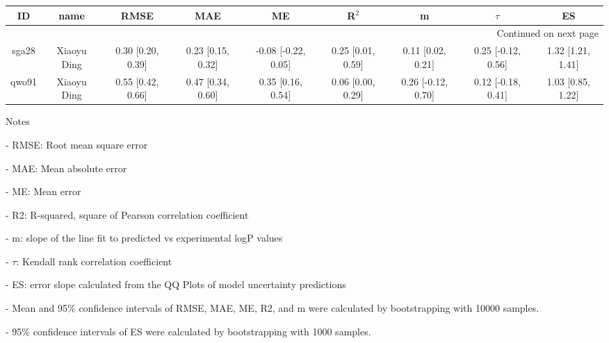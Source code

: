 \documentclass{article}
\begin{document}
\begin{center}
\scriptsize
\begin{longtable}{|ccccccccc|}
\toprule
    ID &         name &               RMSE &                MAE &                   ME &              R$^2$ &                   m &              $\tau$ &                 ES \\
\midrule
\endhead
\midrule
\multicolumn{9}{r}{{Continued on next page}} \\
\midrule
\endfoot

\bottomrule
\endlastfoot
 sga28 &  Xiaoyu Ding &  0.30 [0.20, 0.39] &  0.23 [0.15, 0.32] &  -0.08 [-0.22, 0.05] &  0.25 [0.01, 0.59] &   0.11 [0.02, 0.21] &  0.25 [-0.12, 0.56] &  1.32 [1.21, 1.41] \\
 qwo91 &  Xiaoyu Ding &  0.55 [0.42, 0.66] &  0.47 [0.34, 0.60] &    0.35 [0.16, 0.54] &  0.06 [0.00, 0.29] &  0.26 [-0.12, 0.70] &  0.12 [-0.18, 0.41] &  1.03 [0.85, 1.22] \\
\end{longtable}
\end{center}

Notes

- RMSE: Root mean square error

- MAE: Mean absolute error

- ME: Mean error

- R2: R-squared, square of Pearson correlation coefficient

- m: slope of the line fit to predicted vs experimental logP values

- $\tau$:  Kendall rank correlation coefficient

- ES: error slope calculated from the QQ Plots of model uncertainty predictions

- Mean and 95\% confidence intervals of RMSE, MAE, ME, R2, and m were calculated by bootstrapping with 10000 samples.

- 95\% confidence intervals of ES were calculated by bootstrapping with 1000 samples.\end{document}
\end{document}
